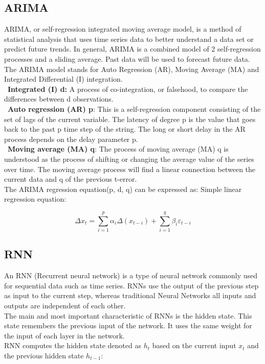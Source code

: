 \documentclass{ieeeojies}
\begin{document}
\subsection{ARIMA}
ARIMA, or self-regression integrated moving average model, is a method of statistical analysis that uses time series data to better understand a data set or predict future trends. In general, ARIMA is a combined model of 2 self-regression processes and a sliding average. Past data will be used to forecast future data.\\
The ARIMA model stands for Auto Regression (AR), Moving Average (MA) and Integrated Differential (I) integration. \\
\indent\textbullet\ \textbf{Integrated (I) d:} A process of co-integration, or falsehood, to compare the differences between d observations.
\\
\indent\textbullet\ \textbf{Auto regression (AR) p}: This is a self-regression component consisting of the set of lags of the current variable. The latency of degree p is the value that goes back to the past p time step of the string. The long or short delay in the AR process depends on the delay parameter p. 
\\
\indent\textbullet\ \textbf{Moving average (MA) q}: The process of moving average (MA) q is understood as the process of shifting or changing the average value of the series over time. The moving average process will find a linear connection between the current data and q of the previous t-error.
\\
The ARIMA regression equation(p, d, q) can be expressed as:
Simple linear regression equation: 
\begin{samepage}
\[\Delta x_t = \sum_{i=1}^{p} \alpha_i \Delta (x_{t-i}) +  \sum_{i=1}^{q} \beta_i \varepsilon_{t-i}\]
\end{samepage}

\subsection{RNN}
An RNN (Recurrent neural network) is a type of neural network commonly used for sequential data such as time series. RNNs use the output of the previous step as input to the current step, whereas traditional Neural Networks all inputs and outputs are independent of each other. 
\\
The main and most important characteristic of RNNs is the hidden state. This state remembers the previous input of the network. It uses the same weight for the input of each layer in the network.
\\
RNN computes the hidden state denoted as \( h_t \) based on the current input \( x_t \) and the previous hidden state \( h_{t-1} \):
\end{document}

